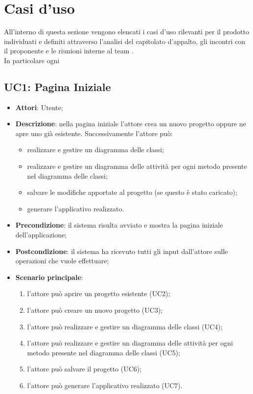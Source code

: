 	
\newpage

\section{Casi d'uso}
All'interno di questa sezione vengono elencati i casi d'uso rilevanti per il prodotto \proj{} individuati e definiti attraverso l'analisi del capitolato d'appalto, gli incontri con il proponente e le riunioni interne al team \hx{}. 
\\In particolare ogni
\subsection{UC1: Pagina Iniziale}
\label{UC1}
\begin{itemize}
\item \textbf{Attori}: Utente;
\item \textbf{Descrizione}: nella pagina iniziale l'attore crea un nuovo progetto oppure ne apre uno già esistente.
Successivamente l'attore può:
	\begin{itemize}
	\item realizzare e gestire un diagramma delle classi;
	\item realizzare e gestire un diagramma delle attività per ogni metodo presente nel diagramma delle classi;
	\item salvare le modifiche apportate al progetto (se questo è stato caricato);
	\item generare l'applicativo realizzato.
	\end{itemize}
\item \textbf{Precondizione}: il sistema risulta avviato e mostra la pagina iniziale dell'applicazione;
\item \textbf{Postcondizione}: il sistema ha ricevuto tutti gli input dall'attore sulle operazioni che vuole effettuare;
\item \textbf{Scenario principale}:
	\begin{enumerate}
	\item l'attore può aprire un progetto esistente (UC2);
	\item l'attore può creare un nuovo progetto (UC3);
	\item l'attore può realizzare e gestire un diagramma delle classi (UC4);
	\item l'attore può realizzare e gestire un diagramma delle attività per ogni metodo presente nel diagramma delle classi (UC5);
	\item l'attore può salvare il progetto (UC6);
	\item l'attore può generare l'applicativo realizzato (UC7).
	\end{enumerate}

\end{itemize}

